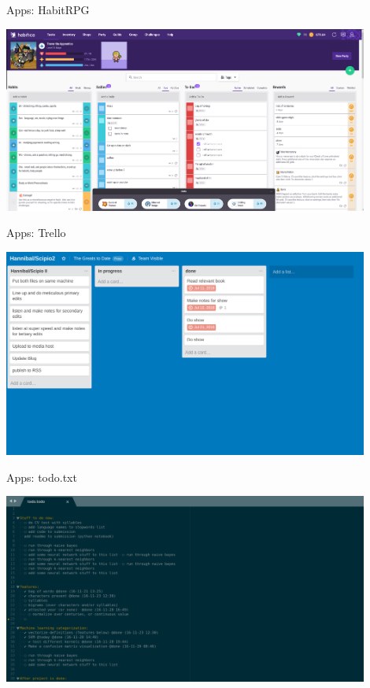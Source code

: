 \documentclass[10pt]{beamer}
\begin{document}
\begin{frame}[c]{Apps: HabitRPG}

\centerline{\includegraphics[width=12cm]{figs/habitica.png}}

\end{frame}

\begin{frame}[c]{Apps: Trello}

\centerline{\includegraphics[width=12cm]{figs/trello.png}}

\end{frame}

\begin{frame}[c]{Apps: todo.txt}

\centerline{\includegraphics[width=12cm]{figs/todotxt.png}}

\end{frame}
\end{document}
